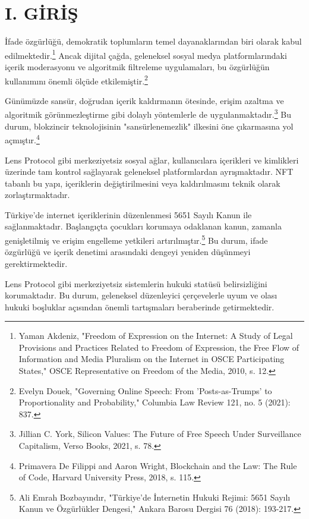 \documentclass[11pt,a4paper]{article}
\begin{document}
\fontsize{11}{13}\selectfont
\setlength{\parindent}{0.75cm}
\justify

\section*{\fontsize{12}{14}\selectfont\bfseries I. GİRİŞ}

İfade özgürlüğü, demokratik toplumların temel dayanaklarından biri olarak kabul edilmektedir.\footnote{Yaman Akdeniz, "Freedom of Expression on the Internet: A Study of Legal Provisions and Practices Related to Freedom of Expression, the Free Flow of Information and Media Pluralism on the Internet in OSCE Participating States," OSCE Representative on Freedom of the Media, 2010, s. 12.} Ancak dijital çağda, geleneksel sosyal medya platformlarındaki içerik moderasyonu ve algoritmik filtreleme uygulamaları, bu özgürlüğün kullanımını önemli ölçüde etkilemiştir.\footnote{Evelyn Douek, "Governing Online Speech: From 'Posts-as-Trumps' to Proportionality and Probability," Columbia Law Review 121, no. 5 (2021): 837.}

Günümüzde sansür, doğrudan içerik kaldırmanın ötesinde, erişim azaltma ve algoritmik görünmezleştirme gibi dolaylı yöntemlerle de uygulanmaktadır.\footnote{Jillian C. York, Silicon Values: The Future of Free Speech Under Surveillance Capitalism, Verso Books, 2021, s. 78.} Bu durum, blokzincir teknolojisinin "sansürlenemezlik" ilkesini öne çıkarmasına yol açmıştır.\footnote{Primavera De Filippi and Aaron Wright, Blockchain and the Law: The Rule of Code, Harvard University Press, 2018, s. 115.}

Lens Protocol gibi merkeziyetsiz sosyal ağlar, kullanıcılara içerikleri ve kimlikleri üzerinde tam kontrol sağlayarak geleneksel platformlardan ayrışmaktadır. NFT tabanlı bu yapı, içeriklerin değiştirilmesini veya kaldırılmasını teknik olarak zorlaştırmaktadır.

Türkiye'de internet içeriklerinin düzenlenmesi 5651 Sayılı Kanun ile sağlanmaktadır. Başlangıçta çocukları korumaya odaklanan kanun, zamanla genişletilmiş ve erişim engelleme yetkileri artırılmıştır.\footnote{Ali Emrah Bozbayındır, "Türkiye'de İnternetin Hukuki Rejimi: 5651 Sayılı Kanun ve Özgürlükler Dengesi," Ankara Barosu Dergisi 76 (2018): 193-217.} Bu durum, ifade özgürlüğü ve içerik denetimi arasındaki dengeyi yeniden düşünmeyi gerektirmektedir.

Lens Protocol gibi merkeziyetsiz sistemlerin hukuki statüsü belirsizliğini korumaktadır. Bu durum, geleneksel düzenleyici çerçevelerle uyum ve olası hukuki boşluklar açısından önemli tartışmaları beraberinde getirmektedir.
\end{document}
